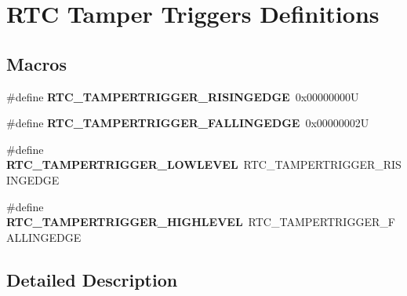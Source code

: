 \hypertarget{group___r_t_c_ex___tamper___trigger___definitions}{}\section{R\+TC Tamper Triggers Definitions}
\label{group___r_t_c_ex___tamper___trigger___definitions}
\subsection*{Macros}
\begin{DoxyCompactItemize}
\item 
\mbox{\label{group___r_t_c_ex___tamper___trigger___definitions_ga7956947a7b9350248051fc077a525474}} 
\#define {\bfseries R\+T\+C\+\_\+\+T\+A\+M\+P\+E\+R\+T\+R\+I\+G\+G\+E\+R\+\_\+\+R\+I\+S\+I\+N\+G\+E\+D\+GE}~0x00000000U
\item 
\mbox{\label{group___r_t_c_ex___tamper___trigger___definitions_gafdc500829e8f36346f1cbca1a52eb083}} 
\#define {\bfseries R\+T\+C\+\_\+\+T\+A\+M\+P\+E\+R\+T\+R\+I\+G\+G\+E\+R\+\_\+\+F\+A\+L\+L\+I\+N\+G\+E\+D\+GE}~0x00000002U
\item 
\mbox{\label{group___r_t_c_ex___tamper___trigger___definitions_ga20c580db49e266f2295aeed5a6915b4e}} 
\#define {\bfseries R\+T\+C\+\_\+\+T\+A\+M\+P\+E\+R\+T\+R\+I\+G\+G\+E\+R\+\_\+\+L\+O\+W\+L\+E\+V\+EL}~R\+T\+C\+\_\+\+T\+A\+M\+P\+E\+R\+T\+R\+I\+G\+G\+E\+R\+\_\+\+R\+I\+S\+I\+N\+G\+E\+D\+GE
\item 
\mbox{\label{group___r_t_c_ex___tamper___trigger___definitions_gae3a6644686f404fa94d23ccab6f5165b}} 
\#define {\bfseries R\+T\+C\+\_\+\+T\+A\+M\+P\+E\+R\+T\+R\+I\+G\+G\+E\+R\+\_\+\+H\+I\+G\+H\+L\+E\+V\+EL}~R\+T\+C\+\_\+\+T\+A\+M\+P\+E\+R\+T\+R\+I\+G\+G\+E\+R\+\_\+\+F\+A\+L\+L\+I\+N\+G\+E\+D\+GE
\end{DoxyCompactItemize}


\subsection{Detailed Description}
